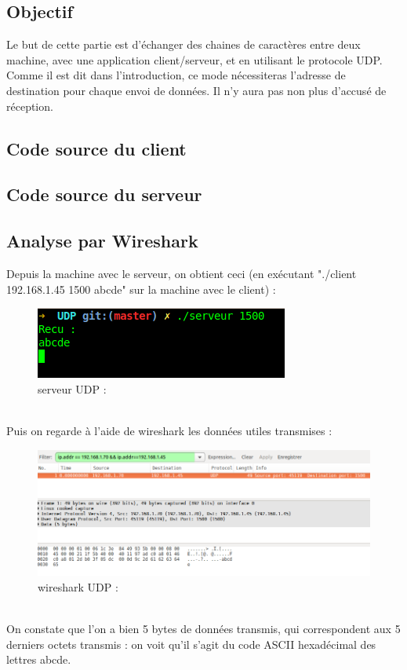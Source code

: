 \documentclass[10pt,a4paper,final]{article}
\begin{document}
	\subsection{Objectif}
		Le but de cette partie est d'échanger des chaines de caractères entre deux machine, avec une application client/serveur, et en utilisant le protocole UDP.\\
		Comme il est dit dans l'introduction, ce mode nécessiteras l'adresse de destination pour chaque envoi de données. Il n'y aura pas non plus d'accusé de réception.

	\subsection{Code source du client}
		

	\subsection{Code source du serveur}
		

	\subsection{Analyse par Wireshark}
		Depuis la machine avec le serveur, on obtient ceci (en exécutant "./client 192.168.1.45 1500 abcde" sur la machine avec le client) :\\
		\begin{figure}[!h] 
			\centering
			\caption{serveur UDP :}
			\includegraphics[scale=0.5]{img/terminal_UDP.png} 
		\end{figure}
		\\
		Puis on regarde à l'aide de wireshark les données utiles transmises :\\
		\begin{figure}[!h] 
			\centering
			\caption{wireshark UDP :}
			\includegraphics[scale=0.4]{img/wireshark_UDP.png} 
		\end{figure}		
		\\
		On constate que l'on a bien 5 bytes de données transmis, qui correspondent aux 5 derniers octets transmis : on voit qu'il s'agit du code ASCII hexadécimal des lettres 
		abcde.\\
\end{document}
